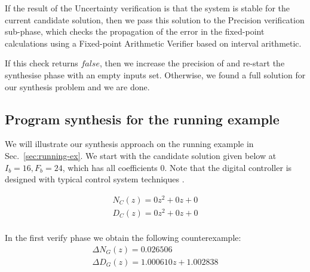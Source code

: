 \documentclass{sig-alternate-05-2015}
\newcommand{\red}[1]{{\color{red}#1}}
\begin{document}
If the result of the {\sc Uncertainty} verification is that
the system is stable for the current candidate solution,
then we pass this solution to the {\sc Precision} verification sub-phase, 
which checks the propagation of the error in the fixed-point 
calculations using a Fixed-point Arithmetic Verifier based on 
interval arithmetic. 
%
%

If this check returns $false$, then we 
increase the precision of  and re-start the {\sc synthesise} phase
with an empty {\sc inputs} set.
Otherwise, we found a full solution for our synthesis problem
and we are done.

\subsection{Program synthesis for the running example}
We will illustrate our synthesis approach on the running example 
in Sec.~\ref{sec:running-ex}.
We start with the candidate solution given below at $I_b=16,F_b=24$,
which has all coefficients 0.
Note that the digital controller is designed with typical control system
techniques \cite{Kuo:2002:ACS:579453,Ogata:1987:DCS:26170}.

$$
\begin{array}{ll}
N_C(z) {=} 0z^2{+}0z{+}0\\
D_C(z) {=} 0z^2{+}0z{+}0\\
\end{array}
$$


In the first {\sc verify} phase we obtain the following counterexample:
$$
\begin{array}{ll}
\Delta N_G(z) = 0.026506\\
\Delta D_G(z) = 1.000610z+1.002838
\end{array}
$$
\end{document}
